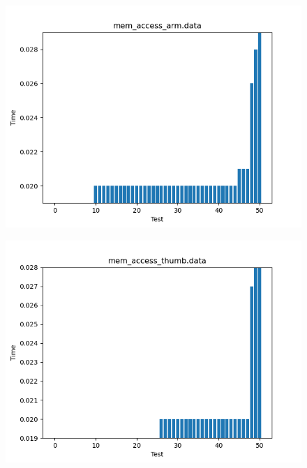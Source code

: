 \documentclass[a4paper,10pt]{article}
\begin{document}
\begin{figure}[H]
 \includegraphics[width=\linewidth]{data/mem_access_arm_sorted.png}
\end{figure}

\begin{figure}[H]
 \includegraphics[width=\linewidth]{data/mem_access_thumb_sorted.png}
\end{figure}
\end{document}

